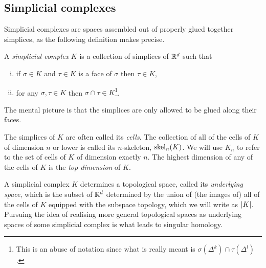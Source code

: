 \documentclass[../main.tex]{subfiles}
\begin{document}
\subsection{Simplicial complexes}
Simplicial complexes are spaces assembled out of properly glued together simplices, as the
following definition makes precise. 
\begin{definition}\label{def:simplicial complex}
	A \emph{simplicial complex} \( K \) is a collection of simplices of \( \mathbb{R}^d \) such that 
	\begin{enumerate}[(i)]
		\item if \( \sigma \in K \) and \( \tau \in K \) is a face of \( \sigma \) then \(
			\tau \in K \),
		\item for any \( \sigma, \tau \in K \) then \( \sigma \cap \tau \in K \)\footnote{This
			is an abuse of notation since what is really meant is \( \sigma(\Delta^k) \cap
		\tau(\Delta^l) \).}. 
	\end{enumerate}
\end{definition}
The mental picture is that the simplices are only allowed to be glued along their faces. 

The simplices of \( K \) are often called its \emph{cells}. The collection of all of the
cells of \( K \) of dimension \( n \) or lower is called its \( n \)-skeleton, \(
\operatorname{skel}_n(K) \). We will use \( K_n \) to refer to the set of cells of \( K \) of dimension
exactly \( n  \). The highest dimension of any of the cells
of \( K \) is the \emph{top dimension} of \( K \). 

A simplicial complex \( K \) determines a topological space, called its \emph{underlying
space}, which is the subset of \( \mathbb{R}^d \) determined by the union of (the images of) all
of the cells of \( K \) equipped with the subspace topology, which we will write as \(
\left\lvert K \right\rvert \). Pursuing the idea of realising more general topological spaces as underlying
spaces of some simplicial complex is what leads to singular homology. 
\end{document}

